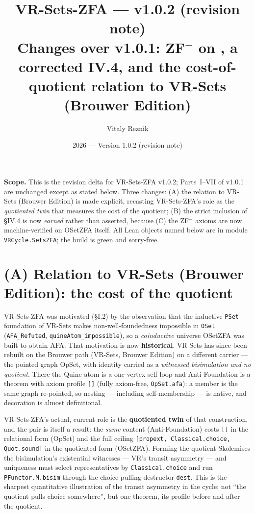 \documentclass[11pt]{article}
\title{\textbf{VR-Sets-ZFA --- v1.0.2 (revision note)}\\[2pt]
\large Changes over v1.0.1: ZF$^-$ on \OSetZFA, a corrected IV.4, and the cost-of-quotient
relation to VR-Sets (Brouwer Edition)}
\author{Vitaly Reznik}
\date{2026 --- Version 1.0.2 (revision note)}
\theoremstyle{remark}
\newcommand{\OSetZFA}{\textsf{OSetZFA}}
\newcommand{\OpSet}{\textsf{OpSet}}
\begin{document}
\maketitle

\noindent\textbf{Scope.} This is the revision delta for VR-Sets-ZFA v1.0.2; Parts~I--VII of v1.0.1
are unchanged except as stated below. Three changes: (A) the relation to VR-Sets (Brouwer Edition) is
made explicit, recasting VR-Sets-ZFA's role as the \emph{quotiented twin} that measures the cost of
the quotient; (B) the strict inclusion of \S IV.4 is now \emph{earned} rather than asserted, because
(C) the ZF$^-$ axioms are now machine-verified on \OSetZFA{} itself. All Lean objects named below are
in module \texttt{VRCycle.SetsZFA}; the build is green and sorry-free.

\section{(A) Relation to VR-Sets (Brouwer Edition): the cost of the quotient}

VR-Sets-ZFA was motivated (\S I.2) by the observation that the inductive \texttt{PSet} foundation of
VR-Sets makes non-well-foundedness impossible in \texttt{OSet} (\texttt{AFA\_Refuted},
\texttt{quineAtom\_impossible}), so a \emph{coinductive} universe \OSetZFA{} was built to obtain AFA.
That motivation is now \textbf{historical}. VR-Sets has since been rebuilt on the Brouwer path
(VR-Sets, Brouwer Edition) on a different carrier --- the pointed graph \OpSet, with identity carried
as a \emph{witnessed bisimulation and no quotient}. There the Quine atom is a one-vertex self-loop and
Anti-Foundation is a theorem with axiom profile \texttt{[]} (fully axiom-free,
\texttt{OpSet.afa}): a member is the same graph re-pointed, so nesting --- including self-membership
--- is native, and decoration is almost definitional.

VR-Sets-ZFA's actual, current role is the \textbf{quotiented twin} of that construction, and the pair
is itself a result: the \emph{same} content (Anti-Foundation) costs \texttt{[]} in the relational
form (\OpSet) and the full ceiling \texttt{[propext, Classical.choice, Quot.sound]} in the quotiented
form (\OSetZFA). Forming the quotient Skolemises the bisimulation's existential witnesses --- VR's
transit asymmetry --- and uniqueness must select representatives by \texttt{Classical.choice} and run
\texttt{PFunctor.M.bisim} through the choice-pulling destructor \texttt{dest}. This is the sharpest
quantitative illustration of the transit asymmetry in the cycle: not ``the quotient pulls choice
somewhere'', but one theorem, its profile before and after the quotient.
\end{document}
